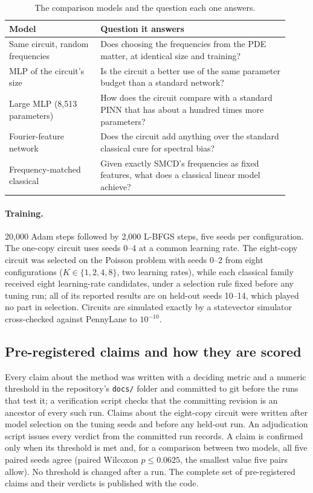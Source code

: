\begin{table}[htbp]
  \centering
  \small
  \begin{tabular}{p{0.3\linewidth}p{0.62\linewidth}}
  \toprule
  Model & Question it answers \\
  \midrule
  Same circuit, random frequencies & Does choosing the frequencies from the PDE matter,
    at identical size and training? \\
  MLP of the circuit's size & Is the circuit a better use of the same parameter budget
    than a standard network? \\
  Large MLP (8{,}513 parameters) & How does the circuit compare with a standard PINN that
    has about a hundred times more parameters? \\
  Fourier-feature network & Does the circuit add anything over the standard classical cure
    for spectral bias? \\
  Frequency-matched classical & Given exactly SMCD's frequencies as fixed features, what
    does a classical linear model achieve? \\
  \bottomrule
  \end{tabular}
  \caption{The comparison models and the question each one answers.}
  \label{tab:baselines}
\end{table}

\paragraph{Training.} 20{,}000 Adam steps followed by 2{,}000 L-BFGS steps, five seeds per
configuration. The one-copy circuit uses seeds 0--4 at a common learning rate. The eight-copy circuit was selected on the Poisson problem with seeds 0--2
from eight configurations ($K\in\{1,2,4,8\}$, two learning rates), while each classical
family received eight learning-rate candidates, under a selection rule fixed before any
tuning run; all of its reported results are on held-out seeds 10--14, which played no
part in selection. Circuits are simulated exactly by a statevector simulator
cross-checked against PennyLane to $10^{-10}$.

\subsection{Pre-registered claims and how they are scored}
\label{sec:claims}
Every claim about the method was written with a deciding metric and a numeric threshold
in the repository's \texttt{docs/} folder and committed to git before the runs that test
it; a verification script checks that the committing revision is an ancestor of every
such run. Claims about the eight-copy circuit were written after model selection on the
tuning seeds and before any held-out run. An adjudication script issues every verdict
from the committed run records. A claim is confirmed only when its threshold is met and,
for a comparison between two models, all five paired seeds agree (paired Wilcoxon
$p\le0.0625$, the smallest value five pairs allow). No threshold is changed after a run.
The complete set of pre-registered claims and their verdicts is published with the code.

